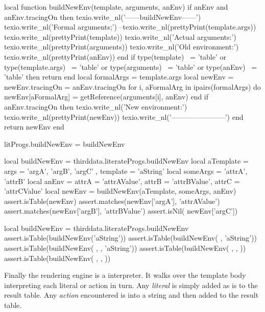 {{\startLuaCode
local function buildNewEnv(template, arguments, anEnv)
  if anEnv and anEnv.tracingOn then
    texio.write_nl('------buildNewEnv------')
    texio.write_nl('Formal arguments;')
    --texio.write_nl(prettyPrint(template.args))
    texio.write_nl(prettyPrint(template))
    texio.write_nl('Actual arguments:')
    texio.write_nl(prettyPrint(arguments))
    texio.write_nl('Old environment:')
    texio.write_nl(prettyPrint(anEnv))
  end
  if type(template)      ~= 'table' or
     type(template.args) ~= 'table' or
     type(arguments)     ~= 'table' or
     type(anEnv)         ~= 'table' then
    return { }
  end
  local formalArgs = template.args
  local newEnv = { }
  newEnv.tracingOn = anEnv.tracingOn
  for i, aFormalArg in ipairs(formalArgs) do
    newEnv[aFormalArg] = getReference(arguments[i], anEnv)
  end
  if anEnv.tracingOn then
    texio.write_nl('New environment:')
    texio.write_nl(prettyPrint(newEnv))
    texio.write_nl('-----------------------')
  end
  return newEnv
end

litProgs.buildNewEnv = buildNewEnv
\stopLuaCode

\startLuaTest
local buildNewEnv = thirddata.literateProgs.buildNewEnv
local aTemplate = { 
  args = { 'argA', 'argB', 'argC' }, 
  template = 'aString'
}
local someArgs  = { 'attrA', 'attrB' }
local anEnv     = {
  attrA = 'attrAValue',
  attrB = 'attrBValue',
  attrC = 'attrCValue'
}
local newEnv = buildNewEnv(aTemplate, someArgs, anEnv)
assert.isTable(newEnv)
assert.matches(newEnv['argA'], 'attrAValue')
assert.matches(newEnv['argB'], 'attrBValue')
assert.isNil(  newEnv['argC'])
\stopLuaTest
\stopTestCase

\startLuaTest
local buildNewEnv = thirddata.literateProgs.buildNewEnv
assert.isTable(buildNewEnv('aString'))
assert.isTable(buildNewEnv( { }, 'aString'))
assert.isTable(buildNewEnv( { }, { }, 'aString'))
assert.isTable(buildNewEnv( { }, { }, { }))
assert.isTable(buildNewEnv( { { }}, { }, { }))
\stopLuaTest
\stopTestCase
\stopTestSuite

\startTestSuite[renderer]

Finally the  rendering engine is a  
interpreter. It walks over the template body interpreting each literal or 
action in turn. Any \emph{literal} is simply added as is to the result 
table. Any \emph{action} encountered is  into a string and 
then added to the result table.

}}
